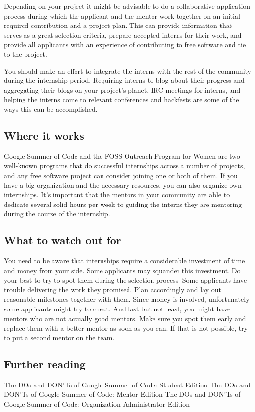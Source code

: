 Depending on your project it might be advisable to do a collaborative application process during which the applicant and the mentor work together on an initial required contribution and a project plan. This can provide information that serves as a great selection criteria, prepare accepted interns for their work, and provide all applicants with an experience of contributing to free software and tie to the project.

You should make an effort to integrate the interns with the rest of the community during the internship period. Requiring interns to blog about their progress and aggregating their blogs on your project’s planet, IRC meetings for interns, and helping the interns come to relevant conferences and hackfests are some of the ways this can be accomplished.

\subsection{Where it works}
Google Summer of Code and the FOSS Outreach Program for Women are two well-known programs that do successful internships across a number of projects, and any free software project can consider joining one or both of them. If you have a big organization and the necessary resources, you can also organize own internships. It’s important that the mentors in your community are able to dedicate several solid hours per week to guiding the interns they are mentoring during the course of the internship.

\subsection{What to watch out for}
You need to be aware that internships require a considerable investment of time and money from your side. Some applicants may squander this investment. Do your best to try to spot them during the selection process. Some applicants have trouble delivering the work they promised. Plan accordingly and lay out reasonable milestones together with them. Since money is involved, unfortunately some applicants might try to cheat. And last but not least, you might have mentors who are not actually good mentors. Make sure you spot them early and replace them with a better mentor as soon as you can. If that is not possible, try to put a second mentor on the team.

\subsection{Further reading}
The DOs and DON’Ts of Google Summer of Code: Student Edition
The DOs and DON’Ts of Google Summer of Code: Mentor Edition
The DOs and DON’Ts of Google Summer of Code: Organization Administrator Edition

